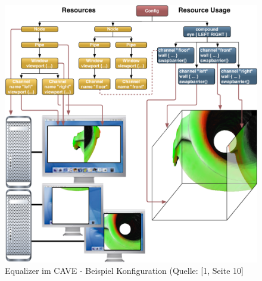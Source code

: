 \begin{figure}[ht]
\begin{center}
\includegraphics[scale=0.2]{../figures/equalizer_resources}
\end{center}
\caption{Equalizer im CAVE - Beispiel Konfiguration (Quelle: [1, Seite 10]}
\label{eq_ex_config}
\end{figure}
